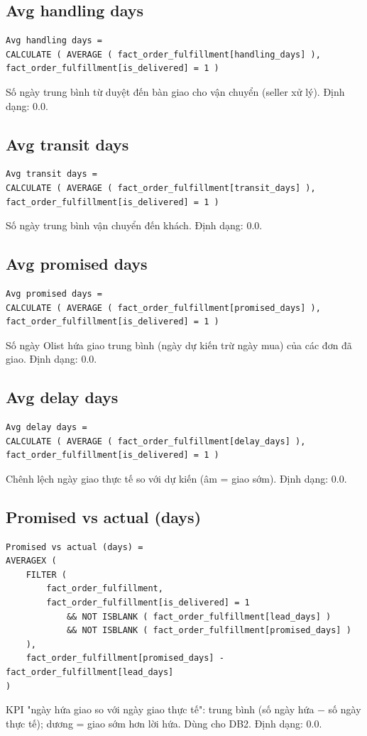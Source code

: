 \subsection*{Avg handling days}
\begin{lstlisting}[language={}]
Avg handling days =
CALCULATE ( AVERAGE ( fact_order_fulfillment[handling_days] ), fact_order_fulfillment[is_delivered] = 1 )
\end{lstlisting}
Số ngày trung bình từ duyệt đến bàn giao cho vận chuyển (seller xử lý). Định dạng: 0.0.

\subsection*{Avg transit days}
\begin{lstlisting}[language={}]
Avg transit days =
CALCULATE ( AVERAGE ( fact_order_fulfillment[transit_days] ), fact_order_fulfillment[is_delivered] = 1 )
\end{lstlisting}
Số ngày trung bình vận chuyển đến khách. Định dạng: 0.0.

\subsection*{Avg promised days}
\begin{lstlisting}[language={}]
Avg promised days =
CALCULATE ( AVERAGE ( fact_order_fulfillment[promised_days] ), fact_order_fulfillment[is_delivered] = 1 )
\end{lstlisting}
Số ngày Olist hứa giao trung bình (ngày dự kiến trừ ngày mua) của các đơn đã giao. Định dạng: 0.0.

\subsection*{Avg delay days}
\begin{lstlisting}[language={}]
Avg delay days =
CALCULATE ( AVERAGE ( fact_order_fulfillment[delay_days] ), fact_order_fulfillment[is_delivered] = 1 )
\end{lstlisting}
Chênh lệch ngày giao thực tế so với dự kiến (âm = giao sớm). Định dạng: 0.0.

\subsection*{Promised vs actual (days)}
\begin{lstlisting}[language={}]
Promised vs actual (days) =
AVERAGEX (
    FILTER (
        fact_order_fulfillment,
        fact_order_fulfillment[is_delivered] = 1
            && NOT ISBLANK ( fact_order_fulfillment[lead_days] )
            && NOT ISBLANK ( fact_order_fulfillment[promised_days] )
    ),
    fact_order_fulfillment[promised_days] - fact_order_fulfillment[lead_days]
)
\end{lstlisting}
KPI "ngày hứa giao so với ngày giao thực tế": trung bình (số ngày hứa − số ngày thực tế); dương = giao sớm hơn lời hứa. Dùng cho DB2. Định dạng: 0.0.

